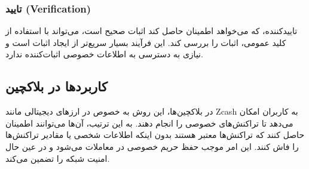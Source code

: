 \documentclass[11pt]{article}
\begin{document}
    \subsubsection*{تایید (Verification)}
    تاییدکننده، که می‌خواهد اطمینان حاصل کند اثبات صحیح است، می‌تواند با استفاده از کلید عمومی، اثبات را بررسی کند. این فرآیند بسیار سریع‌تر از ایجاد اثبات است و نیازی به دسترسی به اطلاعات خصوصی اثبات‌کننده ندارد.

    \subsection*{کاربردها در بلاکچین}
    در بلاکچین‌ها، این روش به خصوص در ارزهای دیجیتالی مانند Zcash به کاربران امکان می‌دهد تا تراکنش‌های خصوصی را انجام دهند. به این ترتیب، آن‌ها می‌توانند اطمینان حاصل کنند که تراکنش‌ها معتبر هستند بدون اینکه اطلاعات شخصی یا مقادیر تراکنش‌ها را فاش کنند. این امر موجب حفظ حریم خصوصی در معاملات می‌شود و در عین حال امنیت شبکه را تضمین می‌کند.
\end{document}
